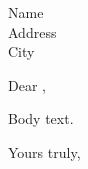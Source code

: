 \documentclass{chletter}
\author{My name}
\date{My location, \today}
\begin{document}
\begin{letter}{Name\\Address\\City}

\opening{Dear \toname,}

Body text.

\closing{Yours truly,}


\end{letter}
\end{document}
